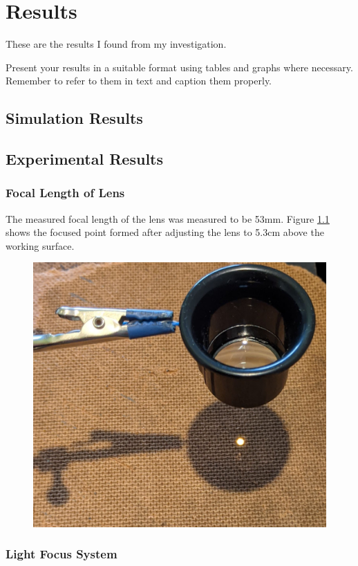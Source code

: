 \chapter{Results}
\label{ch_results}

These are the results I found from my investigation.

Present your results in a suitable format using tables and graphs where necessary. Remember to refer
to them in text and caption them properly.


\section{Simulation Results}


\section{Experimental Results}

\subsection{Focal Length of Lens}

The measured focal length of the lens was measured to be 53mm. Figure \ref{fig:focal_length_experiemnt_result} shows the focused point formed after adjusting the lens to 5.3cm above the working surface.

\begin{figure}[H]
	\centering
	\includegraphics[width=.6\linewidth]{figures/results/focal_length_result.jpg}
	\label{fig:focal_length_experiemnt_result}
\end{figure}


\subsection{Light Focus System}

